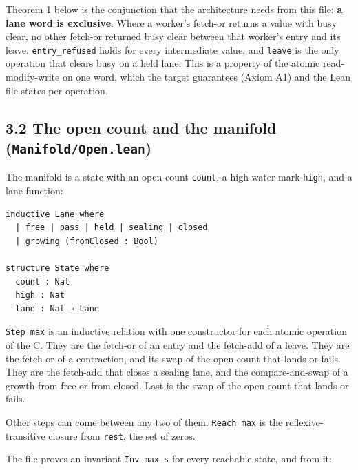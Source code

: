 Theorem 1 below is the conjunction that the architecture needs from this file: \textbf{a lane word is exclusive}. Where a worker's fetch-or returns a value with busy clear, no other fetch-or returned busy clear between that worker's entry and its leave. \texttt{entry\_\allowbreak{}refused} holds for every intermediate value, and \texttt{leave} is the only operation that clears busy on a held lane. This is a property of the atomic read-modify-write on one word, which the target guarantees (Axiom A1) and the Lean file states per operation.

\subsection{\texorpdfstring{3.2 The open count and the manifold (\texttt{Manifold/\allowbreak{}Open.\allowbreak{}lean})}{3.2 The open count and the manifold (Manifold/Open.lean)}}

The manifold is a state with an open count \texttt{count}, a high-water mark \texttt{high}, and a lane function:

\begin{Verbatim}
inductive Lane where
  | free | pass | held | sealing | closed
  | growing (fromClosed : Bool)

structure State where
  count : Nat
  high : Nat
  lane : Nat → Lane
\end{Verbatim}

\texttt{Step max} is an inductive relation with one constructor for each atomic operation of the C. They are the fetch-or of an entry and the fetch-add of a leave. They are the fetch-or of a contraction, and its swap of the open count that lands or fails. They are the fetch-add that closes a sealing lane, and the compare-and-swap of a growth from free or from closed. Last is the swap of the open count that lands or fails.

Other steps can come between any two of them. \texttt{Reach max} is the reflexive-transitive closure from \texttt{rest}, the set of zeros.

The file proves an invariant \texttt{Inv max s} for every reachable state, and from it:

